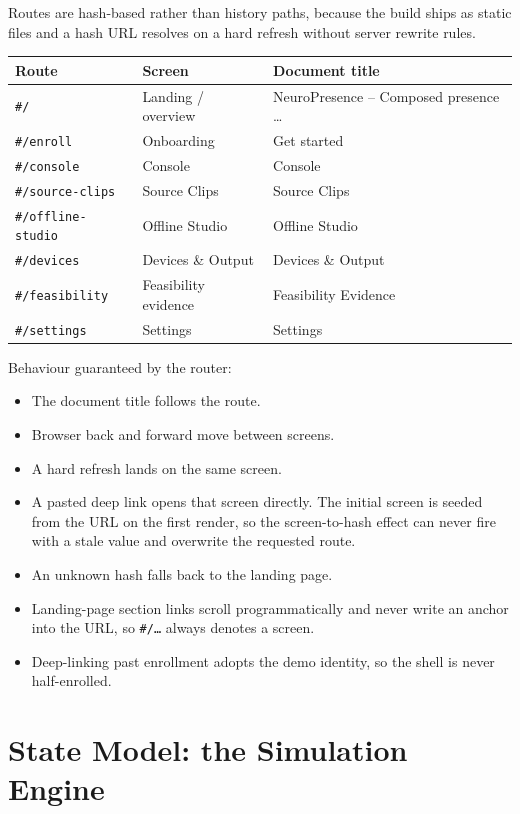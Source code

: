 \documentclass[11pt,a4paper]{report}
\newcommand{\code}[1]{\texttt{\small #1}}
\begin{document}
Routes are hash-based rather than history paths, because the build ships as
static files and a hash URL resolves on a hard refresh without server rewrite
rules.

\begin{longtable}{L{4.6cm} L{4.6cm} L{5.6cm}}
\toprule
\textbf{Route} & \textbf{Screen} & \textbf{Document title} \\
\midrule
\endhead
\code{\#/} & Landing / overview & NeuroPresence -- Composed presence \ldots \\
\code{\#/enroll} & Onboarding & Get started \\
\code{\#/console} & Console & Console \\
\code{\#/source-clips} & Source Clips & Source Clips \\
\code{\#/offline-studio} & Offline Studio & Offline Studio \\
\code{\#/devices} & Devices \& Output & Devices \& Output \\
\code{\#/feasibility} & Feasibility evidence & Feasibility Evidence \\
\code{\#/settings} & Settings & Settings \\
\bottomrule
\end{longtable}

Behaviour guaranteed by the router:

\begin{itemize}
  \item The document title follows the route.
  \item Browser back and forward move between screens.
  \item A hard refresh lands on the same screen.
  \item A pasted deep link opens that screen directly. The initial screen is
    seeded from the URL on the first render, so the screen-to-hash effect can
    never fire with a stale value and overwrite the requested route.
  \item An unknown hash falls back to the landing page.
  \item Landing-page section links scroll programmatically and never write an
    anchor into the URL, so \code{\#/\ldots} always denotes a screen.
  \item Deep-linking past enrollment adopts the demo identity, so the shell is
    never half-enrolled.
\end{itemize}

\chapter{State Model: the Simulation Engine}
\label{ch:engine}
\end{document}
